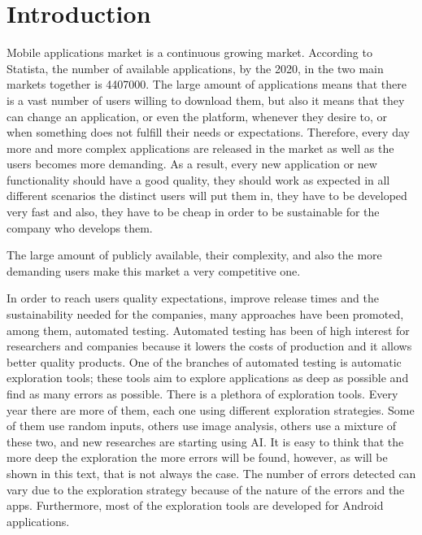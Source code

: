 
\chapter{Introduction} %

\label{Chapter1} %

Mobile applications market is a continuous growing market. According to Statista, the number of available applications, by the 2020, in the two main markets together is 4407000. The large amount of applications means that there is a vast number of users willing to download them, but also it means that they can change an application, or even the platform, whenever they desire to, or when something does not fulfill their needs or expectations. Therefore, every day more and more complex applications are released in the market as well as the users becomes more demanding. As a result, every new application or new functionality should have a good quality, they should work as expected in all different scenarios the distinct users will put them in, they have to be developed very fast and also, they have to be cheap in order to be sustainable for the company who develops them. 

The large amount of publicly available, their complexity, and also the more demanding users make this market a very competitive one.

In order to reach users quality expectations, improve release times  and the sustainability needed for the companies, many approaches have been promoted, among them, automated testing. Automated testing has been of high interest for researchers and companies because it lowers the costs of production and it allows better quality products. One of the branches of automated testing is automatic exploration tools; these tools aim to explore  applications as deep as possible and find as many errors as possible. There is a plethora of exploration tools. Every year there are more of them, each one using different exploration strategies. Some of them use random inputs, others use image analysis, others use a mixture of these two, and new researches are starting using AI. It is easy to think that the more deep the exploration the more errors will be found, however, as will be shown in this text, that is not always the case. The number of errors detected can vary due to the exploration strategy because of the nature of the errors  and the apps. Furthermore, most of the exploration tools are developed for Android applications.

